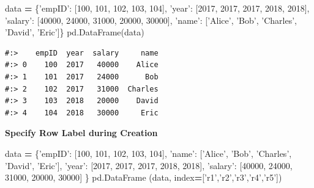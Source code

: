 \documentclass[
]{book}
\newenvironment{Shaded}{\begin{snugshade}}{\end{snugshade}}
\newcommand{\DecValTok}[1]{\textcolor[rgb]{0.06,0.06,0.06}{#1}}
\newcommand{\NormalTok}[1]{#1}
\newcommand{\OperatorTok}[1]{\textcolor[rgb]{0.43,0.43,0.43}{\textbf{#1}}}
\newcommand{\StringTok}[1]{\textcolor[rgb]{0.5,0.5,0.5}{#1}}
\begin{document}
\begin{Shaded}
\begin{Highlighting}[]
\NormalTok{data }\OperatorTok{=}\NormalTok{ \{}\StringTok{'empID'}\NormalTok{:  [}\DecValTok{100}\NormalTok{,      }\DecValTok{101}\NormalTok{,    }\DecValTok{102}\NormalTok{,      }\DecValTok{103}\NormalTok{,     }\DecValTok{104}\NormalTok{],}
        \StringTok{'year'}\NormalTok{:   [}\DecValTok{2017}\NormalTok{,     }\DecValTok{2017}\NormalTok{,   }\DecValTok{2017}\NormalTok{,      }\DecValTok{2018}\NormalTok{,    }\DecValTok{2018}\NormalTok{],}
        \StringTok{'salary'}\NormalTok{: [}\DecValTok{40000}\NormalTok{,    }\DecValTok{24000}\NormalTok{,  }\DecValTok{31000}\NormalTok{,     }\DecValTok{20000}\NormalTok{,   }\DecValTok{30000}\NormalTok{],}
        \StringTok{'name'}\NormalTok{:   [}\StringTok{'Alice'}\NormalTok{, }\StringTok{'Bob'}\NormalTok{,  }\StringTok{'Charles'}\NormalTok{, }\StringTok{'David'}\NormalTok{, }\StringTok{'Eric'}\NormalTok{]\}}
\NormalTok{pd.DataFrame(data)}
\end{Highlighting}
\end{Shaded}

\begin{verbatim}
#:>    empID  year  salary     name
#:> 0    100  2017   40000    Alice
#:> 1    101  2017   24000      Bob
#:> 2    102  2017   31000  Charles
#:> 3    103  2018   20000    David
#:> 4    104  2018   30000     Eric
\end{verbatim}

\textbf{Specify Row Label during Creation}

\begin{Shaded}
\begin{Highlighting}[]
\NormalTok{data }\OperatorTok{=}\NormalTok{ \{}\StringTok{'empID'}\NormalTok{:  [}\DecValTok{100}\NormalTok{,      }\DecValTok{101}\NormalTok{,    }\DecValTok{102}\NormalTok{,      }\DecValTok{103}\NormalTok{,     }\DecValTok{104}\NormalTok{],}
        \StringTok{'name'}\NormalTok{:   [}\StringTok{'Alice'}\NormalTok{, }\StringTok{'Bob'}\NormalTok{,  }\StringTok{'Charles'}\NormalTok{, }\StringTok{'David'}\NormalTok{, }\StringTok{'Eric'}\NormalTok{],}
        \StringTok{'year'}\NormalTok{:   [}\DecValTok{2017}\NormalTok{,     }\DecValTok{2017}\NormalTok{,   }\DecValTok{2017}\NormalTok{,      }\DecValTok{2018}\NormalTok{,    }\DecValTok{2018}\NormalTok{],}
        \StringTok{'salary'}\NormalTok{: [}\DecValTok{40000}\NormalTok{,    }\DecValTok{24000}\NormalTok{,  }\DecValTok{31000}\NormalTok{,     }\DecValTok{20000}\NormalTok{,   }\DecValTok{30000}\NormalTok{] \}}
\NormalTok{pd.DataFrame (data, index}\OperatorTok{=}\NormalTok{[}\StringTok{'r1'}\NormalTok{,}\StringTok{'r2'}\NormalTok{,}\StringTok{'r3'}\NormalTok{,}\StringTok{'r4'}\NormalTok{,}\StringTok{'r5'}\NormalTok{])}
\end{Highlighting}
\end{Shaded}
\end{document}
